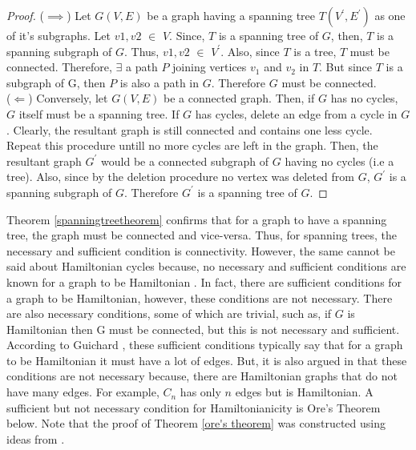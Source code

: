 \documentclass[12pt]{article}
\numberwithin{equation}{subsection}
\numberwithin{table}{subsection}
\numberwithin{algorithm}{subsection}
\numberwithin{figure}{subsection}
\begin{document}
\begin{proof}
($\implies$) Let $\mathit{G(V,E)}$ be a graph having a spanning tree $\mathit{T(V^\prime,E^\prime)}$ as one of it's subgraphs. Let $\mathit{v1, v2}$ $\in$ $\mathit{V}$. Since, $\mathit{T}$ is a spanning tree of $\mathit{G}$, then, $\mathit{T}$ is a spanning subgraph of $\mathit{G}$. Thus, $\mathit{v1, v2}$ $\in$ $V^\prime$. Also, since $\mathit{T}$ is a tree, $\mathit{T}$ must be connected. Therefore, $\exists$ a path $\mathit{P}$ joining vertices $\mathit{v_1}$ and $\mathit{v_2}$ in $\mathit{T}$. But since $\mathit{T}$ is a subgraph of G, then $\mathit{P}$ is also a path in $\mathit{G}$. Therefore $\mathit{G}$ must be connected.\\
($\Leftarrow$) Conversely, let $\mathit{G(V,E)}$ be a connected graph. Then, if $\mathit{G}$ has no cycles, $\mathit{G}$ itself must be a spanning tree. If $\mathit{G}$ has cycles, delete an edge from a cycle in $\mathit{G}$. Clearly, the resultant graph is still connected and contains one less cycle. Repeat this procedure untill no more cycles are left in the graph. Then, the resultant graph $\mathit{G^\prime}$ would be a connected subgraph of $\mathit{G}$ having no cycles (i.e a tree). Also, since by the deletion procedure no vertex was deleted from $\mathit{G}$, $\mathit{G^\prime}$ is a spanning subgraph of $\mathit{G}$. Therefore $\mathit{G^\prime}$ is a spanning tree of $\mathit{G}$.
\end{proof}
Theorem \ref{spanningtreetheorem} confirms that for a graph to have a spanning tree, the graph must be connected and vice-versa. Thus, for spanning trees, the necessary and sufficient condition is connectivity. However, the same cannot be said about Hamiltonian cycles because, no necessary and sufficient conditions are known for a graph to be Hamiltonian \cite{guichard_2018}. In fact, there are sufficient conditions for a graph to be Hamiltonian, however, these conditions are not necessary. There are also necessary conditions, some of which are trivial, such as, if $\mathit{G}$ is Hamiltonian then G must be connected, but this is not necessary and sufficient. According to Guichard \cite{guichard_2018}, these sufficient conditions typically say that for a graph to be Hamiltonian it must have a lot of edges. But, it is also argued in \cite{guichard_2018} that these conditions are not necessary because, there are Hamiltonian graphs that do not have many edges. For example, $\mathit{C_n}$ has only $\mathit{n}$ edges but is Hamiltonian. A sufficient but not necessary condition for Hamiltonianicity is Ore's Theorem below. Note that the proof of Theorem \ref{ore's theorem} was constructed using ideas from {}.
\end{document}
